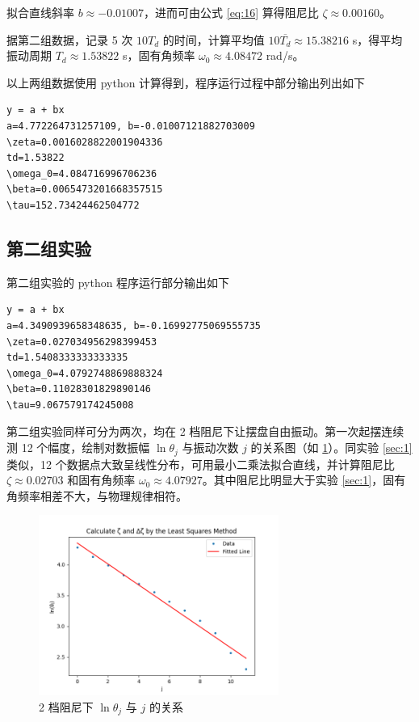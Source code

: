 \documentclass[12pt,a4paper]{amsart}
\begin{document}
拟合直线斜率 $b \approx -0.01007$，进而可由公式 \ref{eq:16} 算得阻尼比 $\zeta \approx 0.00160$。

据第二组数据，记录 5 次 $10T_d$ 的时间，计算平均值 $10\overline{T_d} \approx 15.38216$ s，得平均振动周期 $T_d \approx 1.53822$ s，固有角频率 $\omega_0 \approx 4.08472$ rad/s。

以上两组数据使用 python 计算得到，程序运行过程中部分输出列出如下

\begin{lstlisting}[caption={第一组实验数据处理结果}, label={lst:1}]
y = a + bx
a=4.772264731257109, b=-0.01007121882703009
\zeta=0.0016028822001904336
td=1.53822
\omega_0=4.084716996706236
\beta=0.0065473201668357515
\tau=152.73424462504772
\end{lstlisting}

\subsection{第二组实验}

第二组实验的 python 程序运行部分输出如下

\begin{lstlisting}[label={lst:2}, caption={第二组实验数据处理结果}]
y = a + bx
a=4.3490939658348635, b=-0.16992775069555735
\zeta=0.027034956298399453
td=1.5408333333333335
\omega_0=4.0792748869888324
\beta=0.11028301829890146
\tau=9.067579174245008
\end{lstlisting}

第二组实验同样可分为两次，均在 2 档阻尼下让摆盘自由振动。第一次起摆连续测 12 个幅度，绘制对数振幅 $\ln\theta_j$ 与振动次数 $j$ 的关系图（如 \ref{fig:B_1}）。同实验 \ref{sec:1} 类似，12 个数据点大致呈线性分布，可用最小二乘法拟合直线，并计算阻尼比 $\zeta \approx 0.02703$ 和固有角频率 $\omega_0 \approx 4.07927$。其中阻尼比明显大于实验 \ref{sec:1}，固有角频率相差不大，与物理规律相符。

\begin{figure}[H]
	\centering
	\includegraphics[width=0.7\textwidth]{img/B_1.png}
	\caption{2 档阻尼下 $\ln\theta_j$ 与 $j$ 的关系}
	\label{fig:B_1}
\end{figure}
\end{document}
